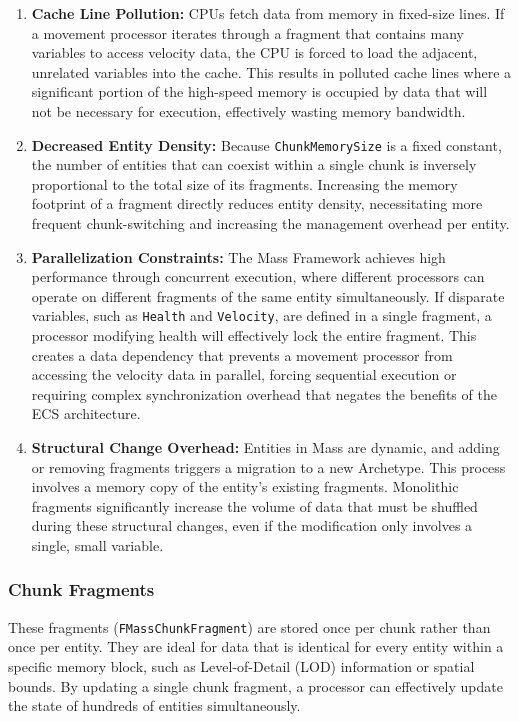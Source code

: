 \begin{enumerate}
\item \textbf{Cache Line Pollution:} CPUs fetch data from memory in fixed-size lines. If a movement processor iterates through a fragment that contains many variables to access velocity data, the CPU is forced to load the adjacent, unrelated variables into the cache. This results in polluted cache lines where a significant portion of the high-speed memory is occupied by data that will not be necessary for execution, effectively wasting memory bandwidth.

\item \textbf{Decreased Entity Density:} Because \texttt{ChunkMemorySize} is a fixed constant, the number of entities that can coexist within a single chunk is inversely proportional to the total size of its fragments. Increasing the memory footprint of a fragment directly reduces entity density, necessitating more frequent chunk-switching and increasing the management overhead per entity.

\item \textbf{Parallelization Constraints:} The Mass Framework achieves high performance through concurrent execution, where different processors can operate on different fragments of the same entity simultaneously. If disparate variables, such as \texttt{Health} and \texttt{Velocity}, are defined in a single fragment, a processor modifying health will effectively lock the entire fragment. This creates a data dependency that prevents a movement processor from accessing the velocity data in parallel, forcing sequential execution or requiring complex synchronization overhead that negates the benefits of the ECS architecture.

\item \textbf{Structural Change Overhead:} Entities in Mass are dynamic, and adding or removing fragments triggers a migration to a new Archetype. This process involves a memory copy of the entity's existing fragments. Monolithic fragments significantly increase the volume of data that must be shuffled during these structural changes, even if the modification only involves a single, small variable.

\end{enumerate}

\subsubsection{Chunk Fragments}

These fragments (\texttt{FMassChunkFragment}) are stored once per chunk rather than once per entity. They are ideal for data that is identical for every entity within a specific memory block, such as Level-of-Detail (LOD) information or spatial bounds. By updating a single chunk fragment, a processor can effectively update the state of hundreds of entities simultaneously.

